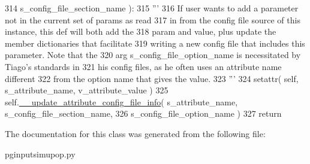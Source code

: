 \begin{DoxyCode}
314             s\_config\_file\_section\_name ):
315         \textcolor{stringliteral}{'''}
316 \textcolor{stringliteral}{        If user wants to add a parameter not in the current set of params as read}
317 \textcolor{stringliteral}{        in from the config file source of this instance, this def will both add the }
318 \textcolor{stringliteral}{        param and value, plus update the member dictionaries that facilitate}
319 \textcolor{stringliteral}{        writing a new config file that includes this parameter.  Note that the}
320 \textcolor{stringliteral}{        arg s\_config\_file\_option\_name is necessitated by Tiago's standards in }
321 \textcolor{stringliteral}{        his config files, as he often uses an attribute name different}
322 \textcolor{stringliteral}{        from the option name that gives the value.}
323 \textcolor{stringliteral}{        '''}
324         setattr( self, s\_attribute\_name, v\_attribute\_value )
325         self.\hyperlink{classnegui_1_1pginputsimupop_1_1PGInputSimuPop_a27abd811d6b6108a9593372c3b0c7881}{\_\_update\_attribute\_config\_file\_info}( s\_attribute\_name, 
      s\_config\_file\_section\_name, 
326                 s\_config\_file\_option\_name )
327         \textcolor{keywordflow}{return}
\end{DoxyCode}


The documentation for this class was generated from the following file\+:\begin{DoxyCompactItemize}
\item 
pginputsimupop.\+py\end{DoxyCompactItemize}

